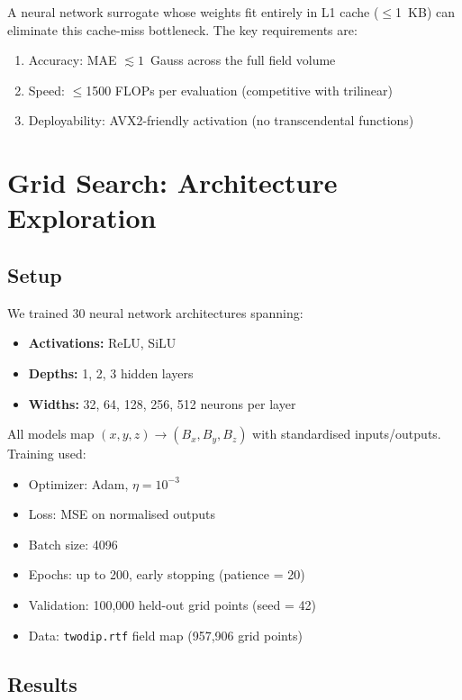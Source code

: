 \documentclass[11pt,a4paper]{article}
\begin{document}
A neural network surrogate whose weights fit entirely in L1 cache
($\leq$1~KB) can eliminate this cache-miss bottleneck. The key requirements
are:
\begin{enumerate}[nosep]
  \item Accuracy: MAE $\lesssim 1$~Gauss across the full field volume
  \item Speed: $\leq$1500 FLOPs per evaluation (competitive with trilinear)
  \item Deployability: AVX2-friendly activation (no transcendental functions)
\end{enumerate}

\section{Grid Search: Architecture Exploration}
\label{sec:grid_search}

\subsection{Setup}

We trained 30 neural network architectures spanning:
\begin{itemize}[nosep]
  \item \textbf{Activations:} ReLU, SiLU
  \item \textbf{Depths:} 1, 2, 3 hidden layers
  \item \textbf{Widths:} 32, 64, 128, 256, 512 neurons per layer
\end{itemize}

All models map $(x, y, z) \to (B_x, B_y, B_z)$ with standardised
inputs/outputs. Training used:
\begin{itemize}[nosep]
  \item Optimizer: Adam, $\eta = 10^{-3}$
  \item Loss: MSE on normalised outputs
  \item Batch size: 4096
  \item Epochs: up to 200, early stopping (patience = 20)
  \item Validation: 100,000 held-out grid points (seed = 42)
  \item Data: \texttt{twodip.rtf} field map (957,906 grid points)
\end{itemize}

\subsection{Results}
\end{document}
